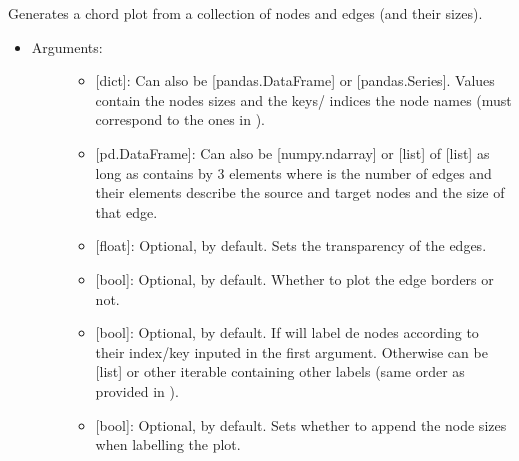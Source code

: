 \documentclass[letterpaper,10pt,english]{sphinxmanual}
\begin{document}

\begin{fulllineitems}
\label{\detokenize{plots:data_tools.plots.chordplot}}
Generates a chord plot from a collection of nodes and edges (and
their sizes).
\begin{itemize}
\item {} \begin{description}
\item[{Arguments:}] \leavevmode\begin{itemize}
\item {} 
 {[}dict{]}: Can also be {[}pandas.DataFrame{]} or
{[}pandas.Series{]}. Values contain the nodes sizes and the keys/
indices the node names (must correspond to the ones in
).

\item {} 
 {[}pd.DataFrame{]}: Can also be {[}numpy.ndarray{]} or {[}list{]}
of {[}list{]} as long as contains  by 3 elements where  is
the number of edges and their elements describe the source and
target nodes and the size of that edge.

\item {} 
 {[}float{]}: Optional,  by default. Sets the
transparency of the edges.

\item {} 
 {[}bool{]}: Optional,  by default. Whether
to plot the edge borders or not.

\item {} 
 {[}bool{]}: Optional,  by default. If 
will label de nodes according to their index/key inputed in
the first argument. Otherwise can be {[}list{]} or other iterable
containing other labels (same order as provided in ).

\item {} 
 {[}bool{]}: Optional,  by default. Sets
whether to append the node sizes when labelling the plot.


\end{itemize}
\end{description}
\end{itemize}
\end{fulllineitems}
\end{document}

